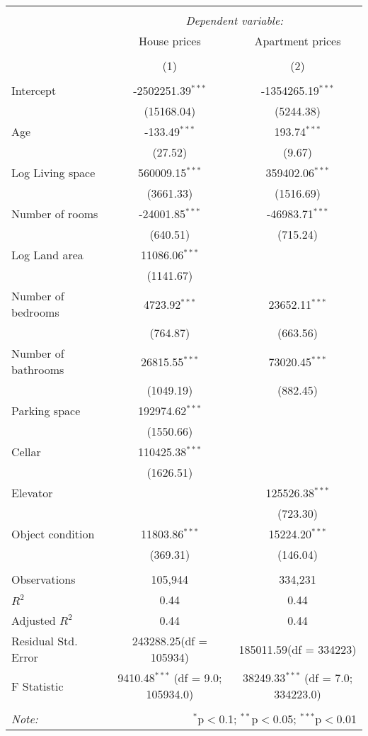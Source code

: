\begin{table}[!htbp] \centering
\begin{tabular}{@{\extracolsep{5pt}}lcc}
\\[-1.8ex]\hline
\hline \\[-1.8ex]
& \multicolumn{2}{c}{\textit{Dependent variable:}} \
\cr \cline{2-3}
\\[-1.8ex] & \multicolumn{1}{c}{House prices} & \multicolumn{1}{c}{Apartment prices}  \\
\\[-1.8ex] & (1) & (2) \\
\hline \\[-1.8ex]
 Intercept & -2502251.39$^{***}$ & -1354265.19$^{***}$ \\
  & (15168.04) & (5244.38) \\
 Age & -133.49$^{***}$ & 193.74$^{***}$ \\
  & (27.52) & (9.67) \\
 Log Living space & 560009.15$^{***}$ & 359402.06$^{***}$ \\
  & (3661.33) & (1516.69) \\
 Number of rooms & -24001.85$^{***}$ & -46983.71$^{***}$ \\
  & (640.51) & (715.24) \\
 Log Land area & 11086.06$^{***}$ & \\
  & (1141.67) & \\
 Number of bedrooms & 4723.92$^{***}$ & 23652.11$^{***}$ \\
  & (764.87) & (663.56) \\
 Number of bathrooms & 26815.55$^{***}$ & 73020.45$^{***}$ \\
  & (1049.19) & (882.45) \\
 Parking space & 192974.62$^{***}$ & \\
  & (1550.66) & \\
 Cellar & 110425.38$^{***}$ & \\
  & (1626.51) & \\
 Elevator & & 125526.38$^{***}$ \\
  & & (723.30) \\
 Object condition & 11803.86$^{***}$ & 15224.20$^{***}$ \\
  & (369.31) & (146.04) \\
\hline \\[-1.8ex]
 Observations & 105,944 & 334,231 \\
 $R^2$ & 0.44 & 0.44 \\
 Adjusted $R^2$ & 0.44 & 0.44 \\
 Residual Std. Error & 243288.25(df = 105934) & 185011.59(df = 334223)  \\
 F Statistic & 9410.48$^{***}$ (df = 9.0; 105934.0) & 38249.33$^{***}$ (df = 7.0; 334223.0) \\
\hline
\hline \\[-1.8ex]
\textit{Note:} & \multicolumn{2}{r}{$^{*}$p$<$0.1; $^{**}$p$<$0.05; $^{***}$p$<$0.01} \\
\end{tabular}
\end{table}